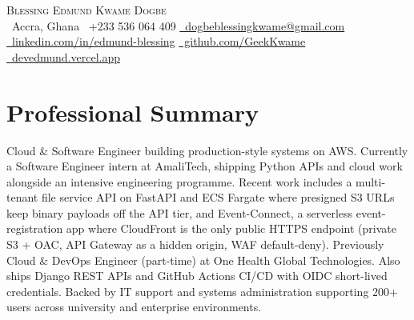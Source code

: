 \documentclass[letterpaper,11pt]{article}
\begin{document}

\begin{center}
  {\Huge \scshape Blessing Edmund Kwame Dogbe}\\[5pt]
  \small
  \faMapMarker*\ Accra, Ghana \quad
  \faPhone\ +233 536 064 409 \quad
  \href{mailto:dogbeblessingkwame@gmail.com}{\faEnvelope\ dogbeblessingkwame@gmail.com}\\[3pt]
  \href{https://linkedin.com/in/edmund-blessing}{\faLinkedin\ linkedin.com/in/edmund-blessing} \quad
  \href{https://github.com/GeekKwame}{\faGithub\ github.com/GeekKwame} \quad
  \href{https://devedmund.vercel.app/}{\faGlobe\ devedmund.vercel.app}
\end{center}

\section{Professional Summary}
Cloud \& Software Engineer building production-style systems on AWS. Currently a Software Engineer intern at AmaliTech, shipping Python APIs and cloud work alongside an intensive engineering programme. Recent work includes a multi-tenant file service API on FastAPI and ECS Fargate where presigned S3 URLs keep binary payloads off the API tier, and Event-Connect, a serverless event-registration app where CloudFront is the only public HTTPS endpoint (private S3 + OAC, API Gateway as a hidden origin, WAF default-deny). Previously Cloud \& DevOps Engineer (part-time) at One Health Global Technologies. Also ships Django REST APIs and GitHub Actions CI/CD with OIDC short-lived credentials. Backed by IT support and systems administration supporting 200+ users across university and enterprise environments.

\end{document}
